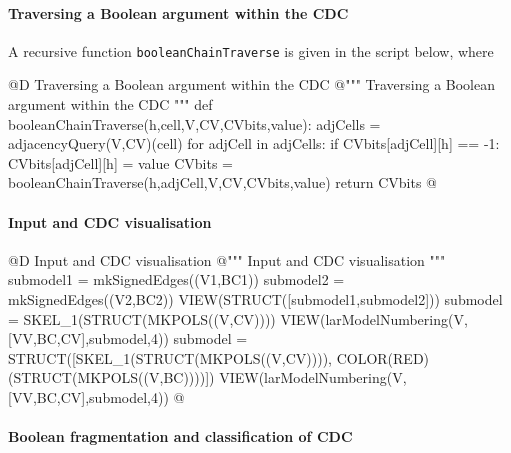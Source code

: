 \documentclass[11pt,oneside]{article}	%
\begin{document}
\paragraph{Traversing a Boolean argument within the CDC}
A recursive function \texttt{booleanChainTraverse} is given in the script below, where 

@D Traversing a Boolean argument within the CDC
@{""" Traversing a Boolean argument within the CDC """
def booleanChainTraverse(h,cell,V,CV,CVbits,value):
	adjCells = adjacencyQuery(V,CV)(cell)
	for adjCell in adjCells: 
		if CVbits[adjCell][h] == -1:
			CVbits[adjCell][h] = value
			CVbits = booleanChainTraverse(h,adjCell,V,CV,CVbits,value)
	return CVbits
@}


\paragraph{Input and CDC visualisation}

@D Input and CDC visualisation
@{""" Input and CDC visualisation """
submodel1 = mkSignedEdges((V1,BC1))
submodel2 = mkSignedEdges((V2,BC2))
VIEW(STRUCT([submodel1,submodel2]))
submodel = SKEL_1(STRUCT(MKPOLS((V,CV))))
VIEW(larModelNumbering(V,[VV,BC,CV],submodel,4))
submodel = STRUCT([SKEL_1(STRUCT(MKPOLS((V,CV)))), COLOR(RED)(STRUCT(MKPOLS((V,BC))))])
VIEW(larModelNumbering(V,[VV,BC,CV],submodel,4))
@}


\paragraph{Boolean fragmentation and classification of CDC}
\end{document}
